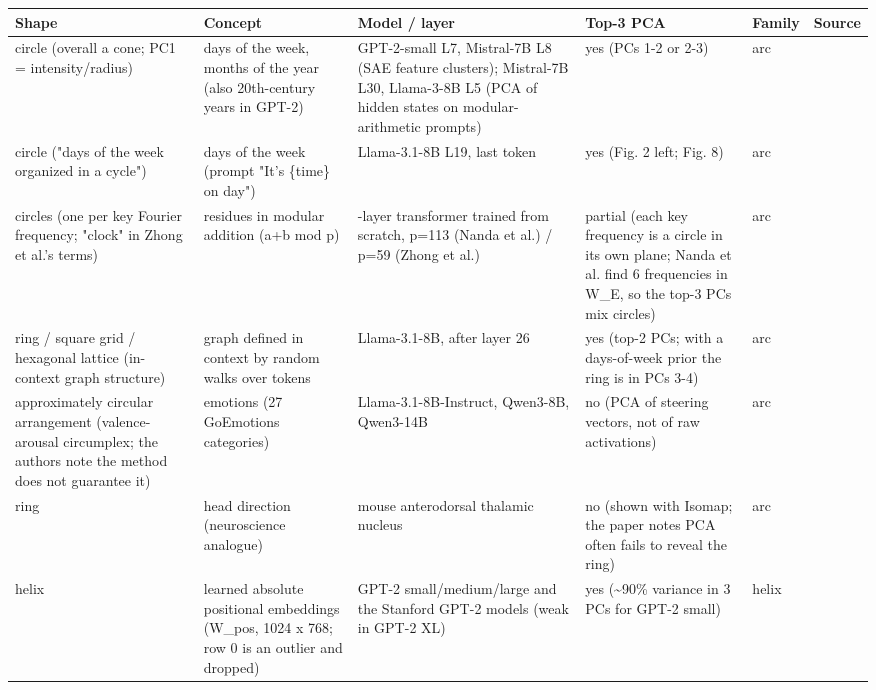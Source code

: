{\scriptsize
\begin{longtable}{>{\raggedright\arraybackslash}p{3.0cm}>{\raggedright\arraybackslash}p{2.8cm}>{\raggedright\arraybackslash}p{3.4cm}>{\raggedright\arraybackslash}p{2.6cm}>{\raggedright\arraybackslash}p{1.3cm}>{\raggedright\arraybackslash}p{2.6cm}}
\toprule
\textbf{Shape} & \textbf{Concept} & \textbf{Model / layer} & \textbf{Top-3 PCA} & \textbf{Family} & \textbf{Source} \\
\midrule
\endhead
circle (overall a cone; PC1 = intensity/radius) & days of the week, months of the year (also 20th-century years in GPT-2) & GPT-2-small L7, Mistral-7B L8 (SAE feature clusters); Mistral-7B L30, Llama-3-8B L5 (PCA of hidden states on modular-arithmetic prompts) & yes (PCs 1-2 or 2-3) & arc & \citet{engels2025notall} \\
circle ("days of the week organized in a cycle") & days of the week (prompt "It's \{time\} on day") & Llama-3.1-8B L19, last token & yes (Fig. 2 left; Fig. 8) & arc & \citet{bhalla2026sae} \\
circles (one per key Fourier frequency; "clock" in Zhong et al.'s terms) & residues in modular addition (a+b mod p) & 1-layer transformer trained from scratch, p=113 (Nanda et al.) / p=59 (Zhong et al.) & partial (each key frequency is a circle in its own plane; Nanda et al. find 6 frequencies in W\_E, so the top-3 PCs mix circles) & arc & \citet{nanda2023progress,zhong2023clock} \\
ring / square grid / hexagonal lattice (in-context graph structure) & graph defined in context by random walks over tokens & Llama-3.1-8B, after layer 26 & yes (top-2 PCs; with a days-of-week prior the ring is in PCs 3-4) & arc & \citet{park2025iclr} \\
approximately circular arrangement (valence-arousal circumplex; the authors note the method does not guarantee it) & emotions (27 GoEmotions categories) & Llama-3.1-8B-Instruct, Qwen3-8B, Qwen3-14B & no (PCA of steering vectors, not of raw activations) & arc & \citet{sun2026valence} \\
ring & head direction (neuroscience analogue) & mouse anterodorsal thalamic nucleus & no (shown with Isomap; the paper notes PCA often fails to reveal the ring) & arc & \citet{chaudhuri2019ring} \\
helix & learned absolute positional embeddings (W\_pos, 1024 x 768; row 0 is an outlier and dropped) & GPT-2 small/medium/large and the Stanford GPT-2 models (weak in GPT-2 XL) & yes (\textasciitilde{}90\% variance in 3 PCs for GPT-2 small) & helix & \citet{yedidia2023helix} \\

\end{longtable}}
